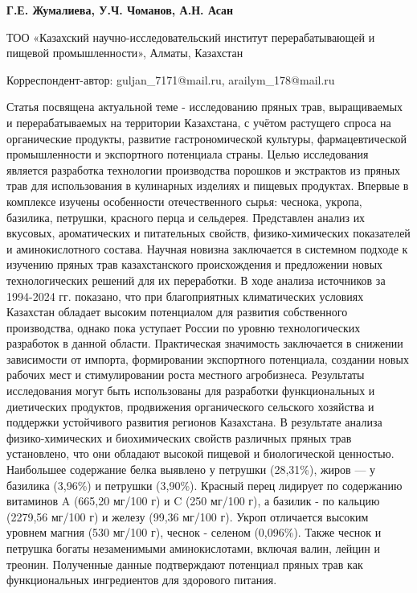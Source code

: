 
\begin{articleheader}

{\bfseries
Г.Е. Жумалиева\textsuperscript{\envelope },
У.Ч. Чоманов,
А.Н. Асан\textsuperscript{\envelope }
}
\end{articleheader}

\begin{affiliation}
ТОО «Казахский научно-исследовательский институт перерабатывающей и
пищевой промышленности», Алматы, Казахстан

\raggedright \textsuperscript{\envelope }Корреспондент-автор: guljan\_7171@mail.ru, arailym\_178@mail.ru
\end{affiliation}

Статья посвящена актуальной теме - исследованию пряных трав,
выращиваемых и перерабатываемых на территории Казахстана, с учётом
растущего спроса на органические продукты, развитие гастрономической
культуры, фармацевтической промышленности и экспортного потенциала
страны. Целью исследования является разработка технологии производства
порошков и экстрактов из пряных трав для использования в кулинарных
изделиях и пищевых продуктах. Впервые в комплексе изучены особенности
отечественного сырья: чеснока, укропа, базилика, петрушки, красного
перца и сельдерея. Представлен анализ их вкусовых, ароматических и
питательных свойств, физико-химических показателей и аминокислотного
состава. Научная новизна заключается в системном подходе к изучению
пряных трав казахстанского происхождения и предложении новых
технологических решений для их переработки. В ходе анализа источников за
1994-2024 гг. показано, что при благоприятных климатических условиях
Казахстан обладает высоким потенциалом для развития собственного
производства, однако пока уступает России по уровню технологических
разработок в данной области. Практическая значимость заключается в
снижении зависимости от импорта, формировании экспортного потенциала,
создании новых рабочих мест и стимулировании роста местного агробизнеса.
Результаты исследования могут быть использованы для разработки
функциональных и диетических продуктов, продвижения органического
сельского хозяйства и поддержки устойчивого развития регионов
Казахстана. В результате анализа физико-химических и биохимических
свойств различных пряных трав установлено, что они обладают высокой
пищевой и биологической ценностью. Наибольшее содержание белка выявлено
у петрушки (28,31\%), жиров --- у базилика (3,96\%) и петрушки (3,90\%).
Красный перец лидирует по содержанию витаминов A (665,20 мг/100 г) и C
(250 мг/100 г), а базилик - по кальцию (2279,56 мг/100 г) и железу
(99,36 мг/100 г). Укроп отличается высоким уровнем магния (530 мг/100
г), чеснок - селеном (0,096\%). Также чеснок и петрушка богаты
незаменимыми аминокислотами, включая валин, лейцин и треонин. Полученные
данные подтверждают потенциал пряных трав как функциональных
ингредиентов для здорового питания.

